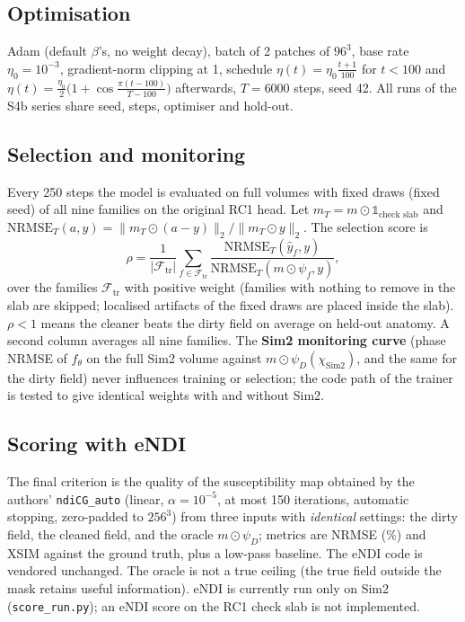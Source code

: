 \documentclass[11pt]{article}
\newcommand{\ind}{\mathds{1}}
\newcommand{\norm}[1]{\lVert #1\rVert}
\newcommand{\abs}[1]{\lvert #1\rvert}
\newcommand{\code}[1]{\texttt{#1}}
\theoremstyle{remark}
\begin{document}
\subsection{Optimisation}
Adam (default $\beta$'s, no weight decay), batch of 2 patches of $96^3$, base rate $\eta_0=10^{-3}$, gradient-norm clipping at 1, schedule
$\eta(t)=\eta_0\frac{t+1}{100}$ for $t<100$ and $\eta(t)=\frac{\eta_0}2\big(1+\cos\frac{\pi(t-100)}{T-100}\big)$ afterwards, $T=6000$ steps, seed 42. All runs of the S4b series share seed, steps, optimiser and hold-out.

\subsection{Selection and monitoring}
Every 250 steps the model is evaluated on full volumes with fixed draws (fixed seed) of all nine families on the original RC1 head. Let $m_T=m\odot\ind_{\text{check slab}}$ and $\mathrm{NRMSE}_T(a,y)=\norm{m_T\odot(a-y)}_2/\norm{m_T\odot y}_2$. The selection score is
\begin{equation}
\rho=\frac1{\abs{\mathcal F_{\mathrm{tr}}}}\sum_{f\in\mathcal F_{\mathrm{tr}}}\frac{\mathrm{NRMSE}_T(\widehat y_f,y)}{\mathrm{NRMSE}_T(m\odot\psi_f,y)},
\end{equation}
over the families $\mathcal F_{\mathrm{tr}}$ with positive weight (families with nothing to remove in the slab are skipped; localised artifacts of the fixed draws are placed inside the slab). $\rho<1$ means the cleaner beats the dirty field on average on held-out anatomy.
A second column averages all nine families. The \textbf{Sim2 monitoring curve} (phase NRMSE of $f_\theta$ on the full Sim2 volume against $m\odot\psi_D(\chi_{\mathrm{Sim2}})$, and the same for the dirty field) never influences training or selection; the code path of the trainer is tested to give identical weights with and without Sim2.

\subsection{Scoring with eNDI}
The final criterion is the quality of the susceptibility map obtained by the authors' \code{ndiCG\_auto} (linear, $\alpha=10^{-5}$, at most 150 iterations, automatic stopping, zero-padded to $256^3$) from three inputs with \emph{identical} settings:
the dirty field, the cleaned field, and the oracle $m\odot\psi_D$; metrics are NRMSE (\%) and XSIM against the ground truth, plus a low-pass baseline. The eNDI code is vendored unchanged.
The oracle is not a true ceiling (the true field outside the mask retains useful information). eNDI is currently run only on Sim2 (\code{score\_run.py}); an eNDI score on the RC1 check slab is not implemented.
\end{document}
